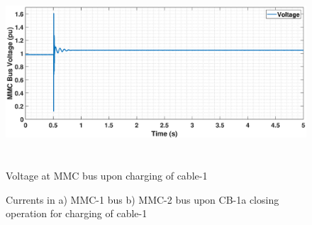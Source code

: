 \begin{figure}[H]
    \includegraphics[height = 7cm,width = \textwidth]{Diagrams/Chapter_5/VACP_MMC_bus_Cab1charg.eps}
    \caption{Voltage at MMC bus upon charging of cable-1}
    \label{VACP_MMC_bus_Cab1charg}
\end{figure}

\begin{figure}[H]


\caption{Currents in a) MMC-1 bus b) MMC-2 bus upon CB-1a closing operation for charging of cable-1}
\label{fig:IABC_MMC_1_2_CB_Cab1charg}
\end{figure}


